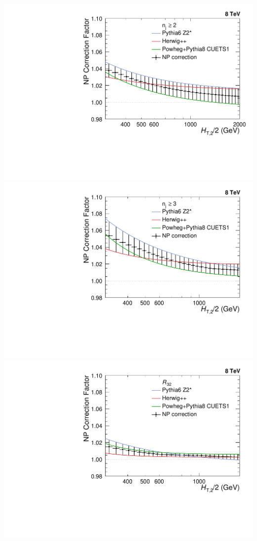 \documentclass{beamer}
\begin{document}
\begin{frame}
\vspace{1.mm}
\hspace{-3.5mm}
\includegraphics[scale=0.21]{Plots_HT_2_150/Final_NP_Corr_2.pdf}%
\includegraphics[scale=0.21]{Plots_HT_2_150/Final_NP_Corr_3.pdf}%
\includegraphics[scale=0.21]{Plots_HT_2_150/Final_NP_Corr_Ratio_32.pdf} \\

\end{frame}
\end{document}

